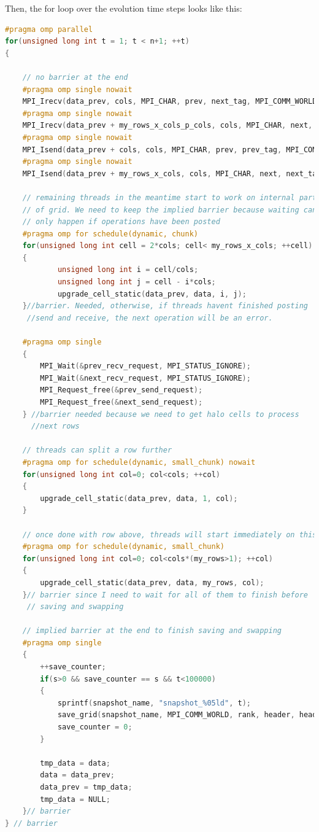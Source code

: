 \documentclass{report}
\begin{document}
Then, the for loop over the evolution time steps looks like this:
\begin{lstlisting}[language=C++]
#pragma omp parallel
for(unsigned long int t = 1; t < n+1; ++t)
{

    // no barrier at the end
    #pragma omp single nowait
    MPI_Irecv(data_prev, cols, MPI_CHAR, prev, next_tag, MPI_COMM_WORLD, &prev_recv_request);
    #pragma omp single nowait
    MPI_Irecv(data_prev + my_rows_x_cols_p_cols, cols, MPI_CHAR, next, prev_tag, MPI_COMM_WORLD, &next_recv_request);
    #pragma omp single nowait
    MPI_Isend(data_prev + cols, cols, MPI_CHAR, prev, prev_tag, MPI_COMM_WORLD, &prev_send_request);
    #pragma omp single nowait
    MPI_Isend(data_prev + my_rows_x_cols, cols, MPI_CHAR, next, next_tag, MPI_COMM_WORLD, &next_send_request);

    // remaining threads in the meantime start to work on internal part 
    // of grid. We need to keep the implied barrier because waiting can 
    // only happen if operations have been posted
    #pragma omp for schedule(dynamic, chunk)
    for(unsigned long int cell = 2*cols; cell< my_rows_x_cols; ++cell)
    {
            unsigned long int i = cell/cols;
            unsigned long int j = cell - i*cols;
            upgrade_cell_static(data_prev, data, i, j);
    }//barrier. Needed, otherwise, if threads havent finished posting 
     //send and receive, the next operation will be an error.

    #pragma omp single
    {
        MPI_Wait(&prev_recv_request, MPI_STATUS_IGNORE);
        MPI_Wait(&next_recv_request, MPI_STATUS_IGNORE);
        MPI_Request_free(&prev_send_request);
        MPI_Request_free(&next_send_request);
    } //barrier needed because we need to get halo cells to process 
      //next rows

    // threads can split a row further 
    #pragma omp for schedule(dynamic, small_chunk) nowait
    for(unsigned long int col=0; col<cols; ++col)
    {
        upgrade_cell_static(data_prev, data, 1, col);
    }

    // once done with row above, threads will start immediately on this
    #pragma omp for schedule(dynamic, small_chunk)
    for(unsigned long int col=0; col<cols*(my_rows>1); ++col)
    {
        upgrade_cell_static(data_prev, data, my_rows, col);
    }// barrier since I need to wait for all of them to finish before 
     // saving and swapping

    // implied barrier at the end to finish saving and swapping
    #pragma omp single
    {
        ++save_counter;
        if(s>0 && save_counter == s && t<100000)
        {
            sprintf(snapshot_name, "snapshot_%05ld", t);
            save_grid(snapshot_name, MPI_COMM_WORLD, rank, header, header_size, my_total_file_offset, data, my_rows, cols);
            save_counter = 0;
        }

        tmp_data = data;
        data = data_prev;
        data_prev = tmp_data;
        tmp_data = NULL;
    }// barrier
} // barrier
\end{lstlisting}
\end{document}
